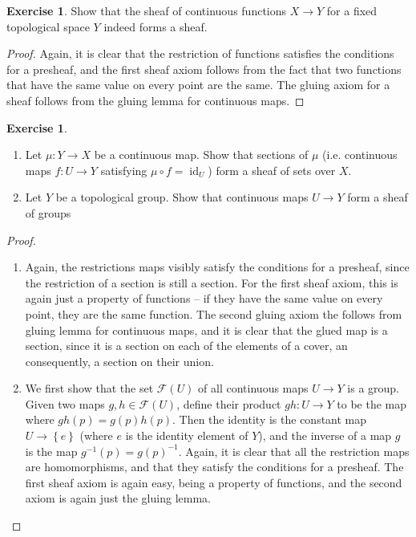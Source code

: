 \documentclass[psamsfonts]{amsart}
\theoremstyle{definition}
\newtheorem{exer}[thm]{Exercise}
\theoremstyle{remark}
\newcommand{\inv}{^{-1}}
\newcommand{\set}[1]{\left\lbrace #1 \right\rbrace}
\newcommand{\enumbreak}{\ \\ \vspace{-\baselineskip}}
\DeclareMathOperator{\id}{id}
\begin{document}
%
\begin{exer}
Show that the sheaf of continuous functions $X \to Y$ for a fixed topological space $Y$ indeed forms a sheaf.
\end{exer}
%
\begin{proof}
Again, it is clear that the restriction of functions satisfies the conditions for a presheaf, and the first sheaf axiom follows from the fact that two functions that have the same value on every point are the same. The gluing axiom for a sheaf follows from the gluing lemma for continuous maps.
\end{proof}
%
\begin{exer} \enumbreak
\begin{enumerate}
\item Let $\mu : Y \to X$ be a continuous map. Show that sections of $\mu$ (i.e. continuous maps $f : U \to Y$ satisfying $\mu \circ f = \id_U$) form a sheaf of sets over $X$. 
\item Let $Y$ be a topological group. Show that continuous maps $U \to Y$ form a sheaf of groups
\end{enumerate}
\end{exer}
%
\begin{proof} \enumbreak
\begin{enumerate}
\item Again, the restrictions maps visibly satisfy the conditions for a presheaf, since the restriction of a section is still a section. For the first sheaf axiom, this is again just a property of functions -- if they have the same value on every point, they are the same function. The second gluing axiom the follows from gluing lemma for continuous maps, and it is clear that the glued map is a section, since it is a section on each of the elements of a cover, an consequently, a section on their union.
\item We first show that the set $\mathscr{F}(U)$ of all continuous maps $U \to Y$ is a group. Given two maps $g,h \in \mathscr{F}(U)$, define their product $gh : U \to Y$ to be the map where $gh(p) = g(p)h(p)$. Then the identity is the constant map $U \to \set{e}$ (where $e$ is the identity element of $Y$), and the inverse of a map $g$ is the map $g\inv(p) = g(p)\inv$. Again, it is clear that all the restriction maps are homomorphisms, and that they satisfy the conditions for a presheaf. The first sheaf axiom is again easy, being a property of functions, and the second axiom is again just the gluing lemma.
\end{enumerate}
\end{proof}
\end{document}

